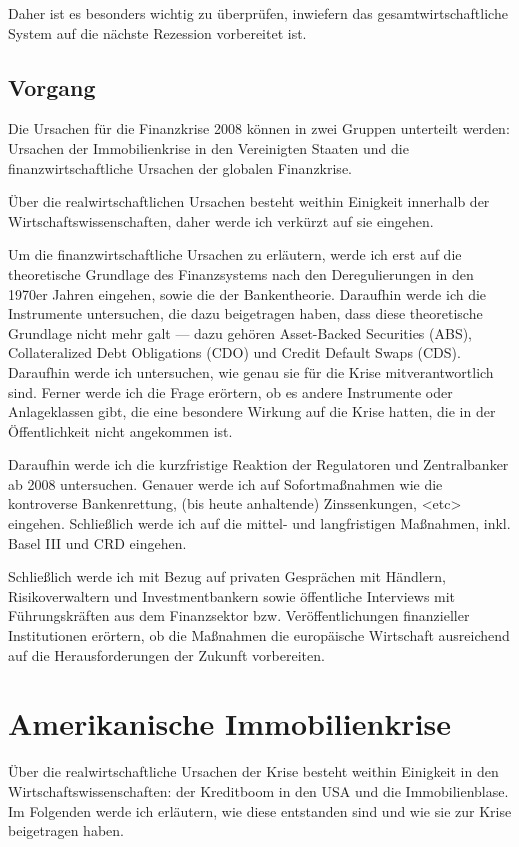 \documentclass[a4paper,11pt]{report}
\begin{document}
Daher ist es besonders wichtig zu
überprüfen, inwiefern das gesamtwirtschaftliche System auf die nächste Rezession vorbereitet ist.
\section{Vorgang}
Die Ursachen für die Finanzkrise 2008 können 
in zwei Gruppen unterteilt werden: Ursachen der Immobilienkrise
in den Vereinigten Staaten und die finanzwirtschaftliche
Ursachen der globalen Finanzkrise.

\"Uber die realwirtschaftlichen Ursachen besteht weithin
Einigkeit innerhalb der Wirtschaftswissenschaften, daher
werde ich verk\"urzt auf sie eingehen.

Um die finanzwirtschaftliche Ursachen zu erläutern, werde
ich erst auf die theoretische Grundlage des Finanzsystems
nach den Deregulierungen in den 1970er Jahren eingehen,
sowie die der Bankentheorie. Daraufhin werde ich die 
Instrumente untersuchen, die dazu beigetragen haben,
dass diese theoretische Grundlage nicht mehr galt --- 
dazu geh\"oren Asset-Backed Securities (ABS),
Collateralized Debt Obligations (CDO) und
Credit Default Swaps (CDS). Daraufhin werde
ich untersuchen, wie genau sie für die
Krise mitverantwortlich sind. Ferner werde ich
die Frage erörtern, ob es andere Instrumente
oder Anlageklassen gibt, die eine
besondere Wirkung auf die Krise hatten, die in
der Öffentlichkeit nicht angekommen ist.

Daraufhin werde ich die kurzfristige Reaktion
der Regulatoren und Zentralbanker ab 2008
untersuchen. Genauer werde ich auf
Sofortmaßnahmen wie die kontroverse
Bankenrettung, (bis heute anhaltende)
Zinssenkungen, <etc> eingehen.
Schließlich werde ich auf die mittel- und
langfristigen Maßnahmen, inkl. Basel
III und CRD eingehen.

Schließlich werde ich mit Bezug auf
privaten Gesprächen mit Händlern,
Risikoverwaltern und Investmentbankern 
sowie \"offentliche Interviews mit F\"uhrungskr\"aften
aus dem Finanzsektor bzw.
Ver\"offentlichungen finanzieller Institutionen
erörtern, ob die Maßnahmen die europäische
Wirtschaft ausreichend auf die
Herausforderungen der Zukunft vorbereiten.

\chapter{Amerikanische Immobilienkrise}
Über die realwirtschaftliche Ursachen der Krise besteht
weithin Einigkeit in den Wirtschaftswissenschaften: 
der Kreditboom in den USA und die Immobilienblase.
Im Folgenden werde ich erläutern, wie diese entstanden
sind und wie sie zur Krise beigetragen haben.
\end{document}
